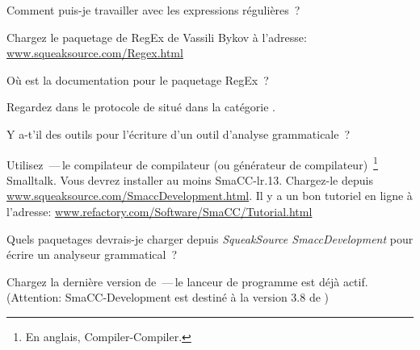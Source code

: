 \documentclass[a4paper,10pt,twoside]{book}
\begin{document}
\begin{faq}
Comment puis-je travailler avec les expressions r\'eguli\`eres~?
\end{faq}
\answer
Chargez le paquetage de RegEx de Vassili Bykov \`a l'adresse: \\
\url{www.squeaksource.com/Regex.html}

\begin{faq}
O\`u est la documentation pour le paquetage RegEx~?
\end{faq}
\answer
Regardez dans le protocole  de  situ\'e dans la cat\'egorie .

\begin{faq}
Y a-t'il des outils pour l'\'ecriture d'un outil d'analyse grammaticale~?
\end{faq}
\answer
Utilisez \,---\,le compilateur de compilateur (ou g\'en\'erateur de compilateur)~\footnote{En anglais, Compiler-Compiler.} Smalltalk.
Vous devrez installer au moins SmaCC-lr.13.
Chargez-le depuis \url{www.squeaksource.com/SmaccDevelopment.html}.
Il y a un bon tutoriel en ligne \`a l'adresse:
\url{www.refactory.com/Software/SmaCC/Tutorial.html}

\begin{faq}
Quels paquetages devrais-je charger depuis \emph{SqueakSource SmaccDevelopment} pour \'ecrire un analyseur grammatical~?
\end{faq}
\answer
Chargez la derni\`ere version de \,---\,le lanceur de programme est d\'ej\`a actif.
(Attention: SmaCC-Development est destin\'e \`a la version 3.8 de \sq)

\ifx\wholebook\relax\else
\end{document}

